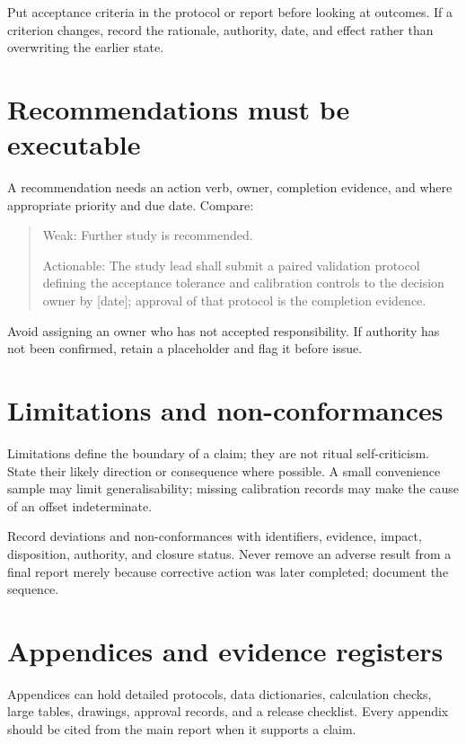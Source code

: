 \begin{goodpractice}
Put acceptance criteria in the protocol or report before looking at outcomes.
If a criterion changes, record the rationale, authority, date, and effect rather
than overwriting the earlier state.
\end{goodpractice}

\section{Recommendations must be executable}

A recommendation needs an action verb, owner, completion evidence, and where
appropriate priority and due date. Compare:

\begin{quote}
Weak: Further study is recommended.

Actionable: The study lead shall submit a paired validation protocol defining
the acceptance tolerance and calibration controls to the decision owner by
[date]; approval of that protocol is the completion evidence.
\end{quote}

Avoid assigning an owner who has not accepted responsibility. If authority has
not been confirmed, retain a placeholder and flag it before issue.

\section{Limitations and non-conformances}

Limitations define the boundary of a claim; they are not ritual self-criticism.
State their likely direction or consequence where possible. A small convenience
sample may limit generalisability; missing calibration records may make the
cause of an offset indeterminate.

Record deviations and non-conformances with identifiers, evidence, impact,
disposition, authority, and closure status. Never remove an adverse result from
a final report merely because corrective action was later completed; document
the sequence.

\section{Appendices and evidence registers}

Appendices can hold detailed protocols, data dictionaries, calculation checks,
large tables, drawings, approval records, and a release checklist. Every
appendix should be cited from the main report when it supports a claim.

